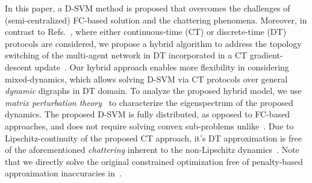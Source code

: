 \documentclass[letterpaper, 10pt, conference]{ieeeconf}
\begin{document}
In this paper, a D-SVM method is proposed that overcomes the challenges of (semi-centralized) FC-based solution and the chattering phenomena. Moreover, in contrast to Refs.~\cite{gharesifard2013distributed,ning2017distributed,garg2019fixed2,rahili_ren,taes2020finite,li2020time,armand2017globally,srivastava2018distributed,mansoori2019fast}, where either continuous-time (CT) or discrete-time (DT) protocols are considered, we propose a hybrid algorithm to address the topology switching of the multi-agent network in DT incorporated in a CT gradient-descent update~\cite{goebel2009hybrid}. Our hybrid approach enables more flexibility in considering mixed-dynamics\cite{ly2012learning,goebel2009hybrid}, which allows solving D-SVM via CT protocols over general \textit{dynamic} digraphs in DT domain. To analyze the proposed hybrid model, we use \textit{matrix perturbation theory}~\cite{stewart1990matrix} to characterize the eigenspectrum of the proposed dynamics. The proposed D-SVM is fully distributed, as opposed to FC-based approaches, and does not require solving convex sub-problems unlike~\cite{navia2006distributed,lu2008distributed,chang2011psvm,bordes2005fast,forero2010consensus}. Due to Lipschitz-continuity of the proposed CT approach, it's DT approximation is free of the aforementioned \textit{chattering} inherent to the non-Lipschitz dynamics~\cite{ning2017distributed,garg2019fixed2,rahili_ren,taes2020finite,li2020time}. Note that we directly solve the original constrained optimization  free of penalty-based approximation inaccuracies in~\cite{srivastava2018distributed,mansoori2019fast,yuan2016convergence}.



\end{document}

